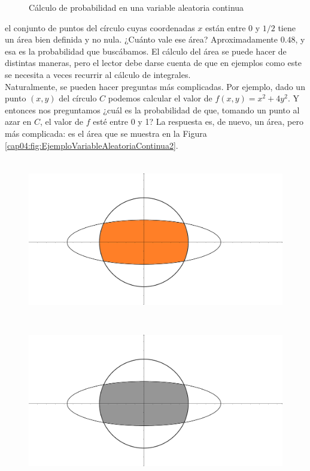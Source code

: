 \begin{Ejemplo}
\begin{figure}[h]
\begin{bn}
	\end{bn}
	\caption{Cálculo de probabilidad en una variable aleatoria continua}
	\label{cap04:fig:EjemploVariableAleatoriaContinua}
    \end{figure}
el conjunto de puntos del círculo cuyas coordenadas $x$ están entre $0$ y $1/2$ tiene un área bien definida y no nula. ¿Cuánto vale ese área? Aproximadamente $0.48$, y esa es la probabilidad que buscábamos. El cálculo del área se puede hacer de distintas maneras, pero el lector debe darse cuenta de que en ejemplos como este se necesita a veces recurrir al cálculo de integrales.\\
    Naturalmente, se pueden hacer preguntas más complicadas. Por ejemplo, dado un punto $(x,y)$ del círculo $C$ podemos calcular el valor de $f(x,y)=x^2+ 4y^2$. Y entonces nos preguntamos ¿cuál es la probabilidad de que, tomando un punto al azar en $C$, el valor de $f$ esté entre 0 y 1? La respuesta es, de nuevo, un área, pero más complicada: es el área que se muestra en la Figura \ref{cap04:fig:EjemploVariableAleatoriaContinua2}.
    \begin{figure}[h]
	\centering
	\begin{enColor}
    \includegraphics[height=7cm]{../fig/Cap04-Figura02-VariableAleatoriaContinua.png}
	\end{enColor}
	\begin{bn}
    \includegraphics[height=7cm]{../fig/Cap04-Figura02-VariableAleatoriaContinua-bn.png}

\end{bn}
\end{figure}
\end{Ejemplo}
